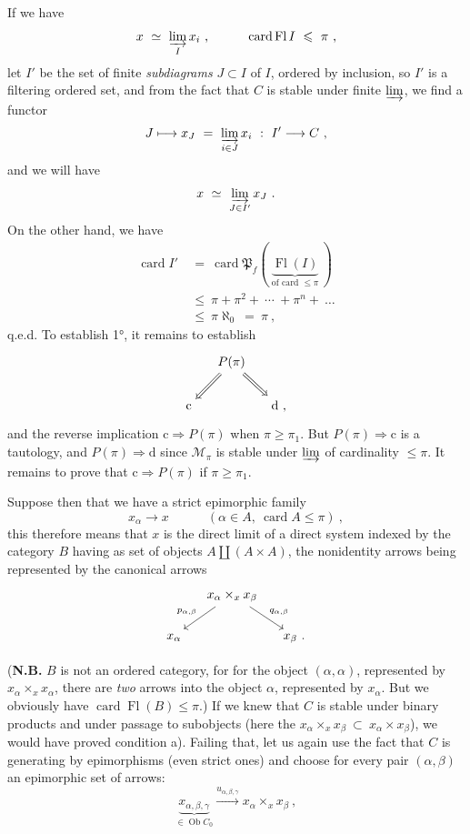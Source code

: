 \documentclass[11pt]{article}
\newcommand{\printedpage}[1]{\marginpar{\footnotesize p.~#1}}
\newcommand{\msp}[1]{\marginpar{\footnotesize [#1]}}
\newcommand{\card}{\operatorname{card}}
\newcommand{\Fl}{\operatorname{Fl}}
\newcommand{\Ob}{\operatorname{Ob}}
\begin{document}
\printedpage{40}

\msp{page 129}
If we have
\[ x \ \simeq \ \varinjlim_{I} x_i \ , \qquad\quad \card \Fl I \ \leqslant \ \pi \ , \]
let $I'$ be the set of finite \textit{subdiagrams} $J \subset I$ of $I$, ordered by inclusion, so $I'$ is a filtering ordered set, and from the fact that $C$ is stable under finite $\varinjlim$, we find a functor
\[ J \longmapsto x_J \ = \ \varinjlim_{i\in J} x_i \ : \ I' \longrightarrow C \ , \]
and we will have
\[ x \ \simeq \ \varinjlim_{J\in I'} x_J \ . \]
On the other hand, we have
\[
\begin{aligned}
\card I' \ &= \ \card \mathfrak{P}_f( \ \underbrace{\Fl(I)}_{\text{of card $\leqslant \pi$}} \ ) \\
&\leqslant \ \pi + \pi^2 + \ \cdots \ + \pi^n + \ \dots \\
&\leqslant \ \pi\aleph_0 \ = \ \pi \ ,
\end{aligned}
\]
q.e.d. To establish 1°, it remains to establish
\[
\begin{tikzcd}[column sep=small]
& P(\pi) \arrow[dl, Rightarrow] \arrow[dr, Rightarrow] & \\
\mathrm{c} & & \mathrm{d} \text{ ,}
\end{tikzcd}
\]
and the reverse implication $\mathrm{c} \Longrightarrow P(\pi)$ when $\pi \geqslant \pi_1$. But $P(\pi) \Longrightarrow \mathrm{c}$ is a tautology, and $P(\pi) \Longrightarrow \mathrm{d}$ since $\mathcal{M}_{\pi}$ is stable under $\varinjlim$ of cardinality $\leqslant \pi$. It remains to prove that $\mathrm{c} \Longrightarrow P(\pi)$ if $\pi \geqslant \pi_1$.

\msp{page 130}
Suppose then that we have a strict epimorphic family
\[ x_{\alpha} \longrightarrow x \qquad\quad (\alpha \in A,\ \card A \leqslant \pi) \ , \]
this therefore means that $x$ is the direct limit of a direct system indexed by the category $B$ having as set of objects $A \amalg (A\times A)$, the nonidentity arrows being represented by the canonical arrows
\[
\begin{tikzcd}[column sep=small]
& x_{\alpha} \times_x x_{\beta} \arrow[dl, "p_{\alpha,\beta}"'] \arrow[dr, "q_{\alpha,\beta}"] & \\
x_{\alpha} & & x_{\beta} \text{ .}
\end{tikzcd}
\]

(\textbf{N.B.} $B$ is not an ordered category, for for the object $(\alpha,\alpha)$, represented by $x_{\alpha}\times_x x_{\alpha}$, %
there are \textit{two} arrows into the object $\alpha$, represented by $x_{\alpha}$. But we obviously have $\card \Fl(B) \leqslant \pi$.) If we knew that $C$ is stable under binary products and under passage to subobjects (here the $x_{\alpha} \times_x x_{\beta} \ \subset \ x_{\alpha} \times x_{\beta}$), we would have proved condition a). Failing that, let us again use the fact that $C$ is generating by epimorphisms (even strict ones) and choose for every pair $(\alpha,\beta)$ an epimorphic set of arrows:
\[ \underbrace{x_{\alpha,\beta,\gamma}}_{\in \Ob C_0} \xrightarrow{u_{\alpha,\beta,\gamma}} x_{\alpha} \times_x x_{\beta} \ , \]
\end{document}
